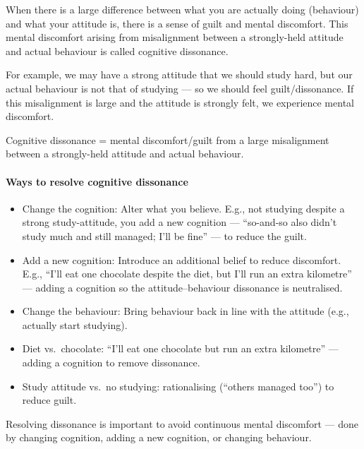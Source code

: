 When there is a large difference between what you are actually doing (behaviour) and what your attitude is, there is a sense of guilt and mental discomfort. This mental discomfort arising from misalignment between a strongly-held attitude and actual behaviour is called cognitive dissonance.

For example, we may have a strong attitude that we should study hard, but our actual behaviour is not that of studying --- so we should feel guilt/dissonance. If this misalignment is large and the attitude is strongly felt, we experience mental discomfort.

\begin{KeyConcept}
Cognitive dissonance = mental discomfort/guilt from a large misalignment between a strongly-held attitude and actual behaviour.
\end{KeyConcept}

\paragraph{Ways to resolve cognitive dissonance}
\begin{itemize}
\item Change the cognition: Alter what you believe. E.g., not studying despite a strong study-attitude, you add a new cognition --- ``so-and-so also didn't study much and still managed; I'll be fine'' --- to reduce the guilt.
\item Add a new cognition: Introduce an additional belief to reduce discomfort. E.g., ``I'll eat one chocolate despite the diet, but I'll run an extra kilometre'' --- adding a cognition so the attitude--behaviour dissonance is neutralised.
\item Change the behaviour: Bring behaviour back in line with the attitude (e.g., actually start studying).
\end{itemize}

\begin{ExampleBox}
\begin{itemize}
\item Diet vs.\ chocolate: ``I'll eat one chocolate but run an extra kilometre'' --- adding a cognition to remove dissonance.
\item Study attitude vs.\ no studying: rationalising (``others managed too'') to reduce guilt.
\end{itemize}
\end{ExampleBox}

\begin{CriticalPoint}
Resolving dissonance is important to avoid continuous mental discomfort --- done by changing cognition, adding a new cognition, or changing behaviour.
\end{CriticalPoint}


